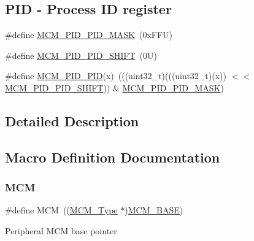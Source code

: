 \subsection*{P\+ID -\/ Process ID register}
\begin{DoxyCompactItemize}
\item 
\#define \mbox{\hyperlink{group___m_c_m___register___masks_ga258efdcb0108c5e954d399d9a6e8883a}{M\+C\+M\+\_\+\+P\+I\+D\+\_\+\+P\+I\+D\+\_\+\+M\+A\+SK}}~(0x\+F\+F\+U)
\item 
\#define \mbox{\hyperlink{group___m_c_m___register___masks_ga579f075ec9afb3010ecf64eea087a04a}{M\+C\+M\+\_\+\+P\+I\+D\+\_\+\+P\+I\+D\+\_\+\+S\+H\+I\+FT}}~(0\+U)
\item 
\#define \mbox{\hyperlink{group___m_c_m___register___masks_ga6d4eaf3c8f87daf3e83324656d130eb6}{M\+C\+M\+\_\+\+P\+I\+D\+\_\+\+P\+ID}}(x)~(((uint32\+\_\+t)(((uint32\+\_\+t)(x)) $<$$<$ \mbox{\hyperlink{group___m_c_m___register___masks_ga579f075ec9afb3010ecf64eea087a04a}{M\+C\+M\+\_\+\+P\+I\+D\+\_\+\+P\+I\+D\+\_\+\+S\+H\+I\+FT}})) \& \mbox{\hyperlink{group___m_c_m___register___masks_ga258efdcb0108c5e954d399d9a6e8883a}{M\+C\+M\+\_\+\+P\+I\+D\+\_\+\+P\+I\+D\+\_\+\+M\+A\+SK}})
\end{DoxyCompactItemize}


\subsection{Detailed Description}


\subsection{Macro Definition Documentation}
\mbox{\label{group___m_c_m___register___masks_ga4cd2dcee5e786e36844ed653cfa40096}} 
\subsubsection{\texorpdfstring{M\+CM}{MCM}}
{\footnotesize\ttfamily \#define M\+CM~((\mbox{\hyperlink{struct_m_c_m___type}{M\+C\+M\+\_\+\+Type}} $\ast$)\mbox{\hyperlink{group___m_c_m___register___masks_ga84250d5694181f040a437d9125af3fac}{M\+C\+M\+\_\+\+B\+A\+SE}})}

Peripheral M\+CM base pointer \mbox{\label{group___m_c_m___register___masks_ga84250d5694181f040a437d9125af3fac}} 

